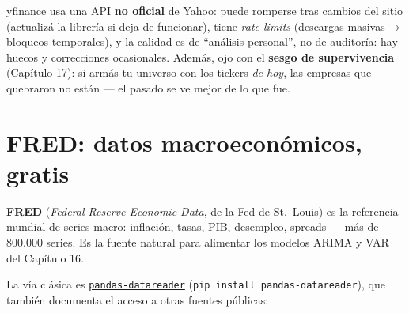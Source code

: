 \documentclass[
  spanish,
  letterpaper,
  DIV=11,
  numbers=noendperiod]{scrreprt}
\begin{document}
\begin{tcolorbox}[enhanced jigsaw, bottomrule=.15mm, colback=white, opacitybacktitle=0.6, arc=.35mm, toprule=.15mm, opacityback=0, breakable, titlerule=0mm, left=2mm, coltitle=black, colbacktitle=quarto-callout-warning-color!10!white, colframe=quarto-callout-warning-color-frame, leftrule=.75mm, toptitle=1mm, bottomtitle=1mm, title=\textcolor{quarto-callout-warning-color}{\faExclamationTriangle}\hspace{0.5em}{Las limitaciones de lo gratuito}, rightrule=.15mm]

yfinance usa una API \textbf{no oficial} de Yahoo: puede romperse tras
cambios del sitio (actualizá la librería si deja de funcionar), tiene
\emph{rate limits} (descargas masivas → bloqueos temporales), y la
calidad es de ``análisis personal'', no de auditoría: hay huecos y
correcciones ocasionales. Además, ojo con el \textbf{sesgo de
supervivencia} (Capítulo 17): si armás tu universo con los tickers
\emph{de hoy}, las empresas que quebraron no están --- el pasado se ve
mejor de lo que fue.

\end{tcolorbox}

\section{FRED: datos macroeconómicos,
gratis}\label{fred-datos-macroeconuxf3micos-gratis}

\textbf{FRED} (\emph{Federal Reserve Economic Data}, de la Fed de
St.~Louis) es la referencia mundial de series macro: inflación, tasas,
PIB, desempleo, spreads --- más de 800.000 series. Es la fuente natural
para alimentar los modelos ARIMA y VAR del Capítulo 16.

La vía clásica es
\href{https://pandas-datareader.readthedocs.io}{\texttt{pandas-datareader}}
(\texttt{pip\ install\ pandas-datareader}), que también documenta el
acceso a otras fuentes públicas:
\end{document}
